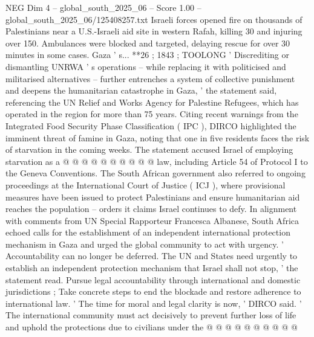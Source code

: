 \begin{textsample}{NEG Dim 4 – global\_south\_2025\_06 – Score 1.00 – global\_south\_2025\_06/125408257.txt}
Israeli forces opened fire on thousands of Palestinians near a U.S.-Israeli aid site in western Rafah, killing 30 and injuring over 150.
Ambulances were blocked and targeted, delaying rescue for over 30 minutes in some cases.
Gaza ' s... **26 ; 1843 ; TOOLONG ' Discrediting or dismantling UNRWA ' s operations -- while replacing it with politicised and militarised alternatives -- further entrenches a system of collective punishment and deepens the humanitarian catastrophe in Gaza, ' the statement said, referencing the UN Relief and Works Agency for Palestine Refugees, which has operated in the region for more than 75 years.
Citing recent warnings from the Integrated Food Security Phase Classification ( IPC ), DIRCO highlighted the imminent threat of famine in Gaza, noting that one in five residents faces the risk of starvation in the coming weeks.
The statement accused Israel of employing starvation as a @ @ @ @ @ @ @ @ @ @ law, including Article 54 of Protocol I to the Geneva Conventions.
The South African government also referred to ongoing proceedings at the International Court of Justice ( ICJ ), where provisional measures have been issued to protect Palestinians and ensure humanitarian aid reaches the population -- orders it claims Israel continues to defy.
In alignment with comments from UN Special Rapporteur Francesca Albanese, South Africa echoed calls for the establishment of an independent international protection mechanism in Gaza and urged the global community to act with urgency. ' Accountability can no longer be deferred.
The UN and States need urgently to establish an independent protection mechanism that Israel shall not stop, ' the statement read.
Pursue legal accountability through international and domestic jurisdictions ; Take concrete steps to end the blockade and restore adherence to international law. ' The time for moral and legal clarity is now, ' DIRCO said. ' The international community must act decisively to prevent further loss of life and uphold the protections due to civilians under the @ @ @ @ @ @ @ @ @ @

\end{textsample}

